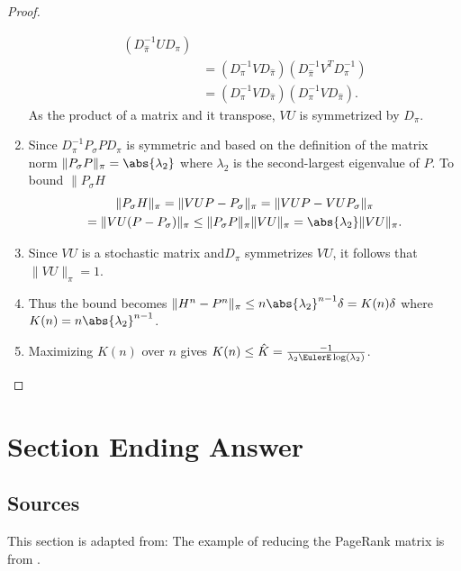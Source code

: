 \documentclass[12pt]{article}
\begin{document}
\begin{proof}
\begin{enumerate}
\begin{align*}
                (D_{\hat{\pi}}^{-1} U D_{\pi}) \\
                &= (D_{\pi}^{-1} V D_{\hat{\pi}})(D_{\hat{\pi}}^{-1} V^T
                D_{\pi}^{-1}) \\
                &= (D_{\pi}^{-1} V D_{\hat{\pi}})(D_{\pi}^{-1} V D_{\hat
                {\pi}}).
            \end{align*}
            As the product of a matrix and it transpose, \( VU \) is
            symmetrized by \( D_{\pi} \).
        \item
            Since \( D_{\pi}^{-1} P_{\sigma} P D_{\pi} \) is symmetric
            and based on the definition of the matrix norm \( \| P_{\sigma}
            P \|_{\pi} = \abs{\lambda_2} \) where \( \lambda_2 \) is the
            second-largest eigenvalue of \( P \).  To bound \( \| P_{\sigma}
            H \)
            \begin{multline*}
                \| P_{\sigma} H \|_{\pi} = \| VUP - P_{\sigma} \|_{\pi}
                = \| VUP - VUP_{\sigma}\|_{\pi} \\
                = \| VU(P - P_{\sigma})\|_{\pi} \le \|P_{\sigma} P\|_{\pi}
                \|VU\|_{\pi} = \abs{\lambda_2} \|VU\|_{\pi}.
            \end{multline*}
        \item
            Since \( VU \) is a stochastic matrix and\( D_{\pi} \)
            symmetrizes \( VU \), it follows that \( \| VU \|_{\pi} = 1 \).
        \item
            Thus the bound becomes \( \| H^n - P^n\|_{\pi} \le n \abs{\lambda_2}^
            {n-1} \delta = K(n) \delta \) where \( K(n) = n \abs{\lambda_2}^
            {n-1} \).
        \item
            Maximizing \( K(n) \) over \( n \) gives \( K(n) \le \hat{K}
            = \frac{-1}{\lambda_2 \EulerE \log(\lambda_2)} \).
    \end{enumerate}
\end{proof}

\section*{Section Ending Answer}

\subsection*{Sources} This section is adapted from:
The example of reducing the PageRank matrix is from
.
\end{document}
